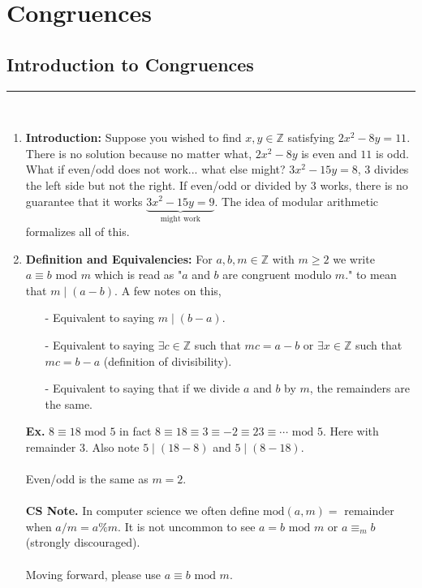 \documentclass[class=article, crop=false]{standalone}
\def\integers{{\mathbb Z}}
\begin{document}
    
\section{Congruences}

\subsection{Introduction to Congruences}
\rule{\textwidth}{1pt}\\
\begin{enumerate}[1.]
	\item \textbf{Introduction:} Suppose you wished to find $x,y\in\integers$ satisfying $2x^2 -8y=11$. There is no solution
	because no matter what, $2x^2 -8y$ is even and $11$ is odd. What if even/odd does not work...
	what else might? $3x^2-15y=8$, 3 divides the left side but not the right.
	If even/odd or divided by 3 works, there is no guarantee that it works 
	$\underbrace{3x^2-15y=9}_{\text{might work}}$.
	The idea of modular arithmetic formalizes all of this.

	\item \textbf{Definition and Equivalencies:} 
	For $a,b,m\in\integers$ with $m\geq2$ we write $a\equiv b\mbox{ mod }m$ which is
	read as "$a$ and $b$ are congruent modulo $m$." to mean that $m\mid (a-b)$. A few notes on this,
	\begin{itemize}
		\item[-] Equivalent to saying $m\mid (b-a)$.
		\item[-] Equivalent to saying $\exists c\in\integers$ such that $mc=a-b$ or $\exists x\in\integers$
		such that $mc=b-a$ (definition of divisibility).
		\item[-] Equivalent to saying that if we divide $a$ and $b$ by $m$, the remainders are the same.
	\end{itemize}
	\textbf{Ex.} $8\equiv 18\mbox{ mod } 5$ in fact $8\equiv18\equiv3\equiv-2\equiv23\equiv\cdots\mbox{ mod }5$.
	Here with remainder 3. Also note $5\mid (18-8)$ and $5\mid (8-18)$.\\\\
	Even/odd is the same as $m=2$.\\\\
	\textbf{CS Note.} In computer science we often define $\mbox{mod}(a,m)= $ remainder when $a/m=a\%m$.
	It is not uncommon to see $a=b\mbox{ mod }m$ or $a\equiv_m b$ (strongly discouraged).\\\\
	Moving forward, please use $a\equiv b\mbox{ mod }m$.
	

\end{enumerate}
\end{document}
